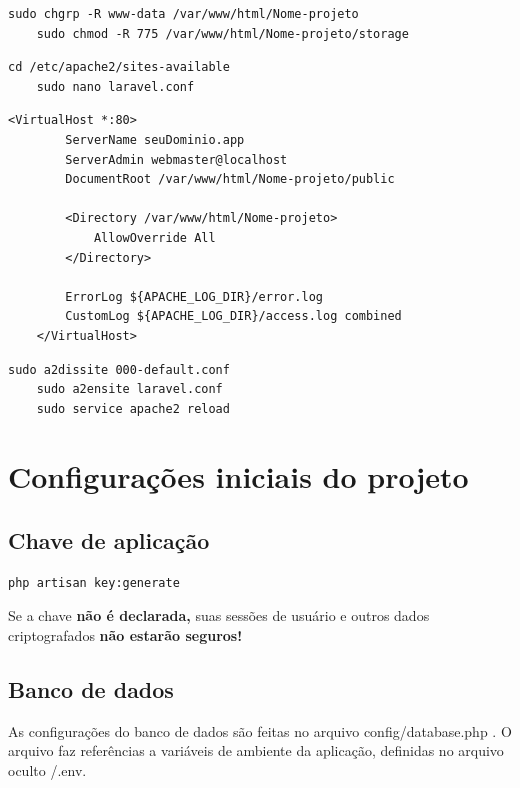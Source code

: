 \documentclass[
12pt,				%
openany,			%
twoside,			%
a4paper,			%
english,			%
french,				%
spanish,			%
brazil,				%
]{abntex2}
\begin{document}
\begin{lstlisting}[style=bash,caption={Permissões de acesso no apache}]
    sudo chgrp -R www-data /var/www/html/Nome-projeto
    sudo chmod -R 775 /var/www/html/Nome-projeto/storage
\end{lstlisting}

\begin{lstlisting}[style=bash,caption={Arquivo de configuração do projeto}]
    cd /etc/apache2/sites-available
    sudo nano laravel.conf
\end{lstlisting}

\begin{lstlisting}[style=bash,caption={\textit{laravel.conf}}]
    <VirtualHost *:80>
        ServerName seuDominio.app
        ServerAdmin webmaster@localhost
        DocumentRoot /var/www/html/Nome-projeto/public

        <Directory /var/www/html/Nome-projeto>
            AllowOverride All
        </Directory>

        ErrorLog ${APACHE_LOG_DIR}/error.log
        CustomLog ${APACHE_LOG_DIR}/access.log combined
    </VirtualHost>
\end{lstlisting}

\begin{lstlisting}[style=bash,caption={Desabilitando virtualhost padrão e habilitando o novo}]
    sudo a2dissite 000-default.conf
    sudo a2ensite laravel.conf
    sudo service apache2 reload
\end{lstlisting}

\section{Configurações iniciais do projeto}

\subsection{Chave de aplicação}

\begin{lstlisting}[style=bash,caption={Gerando chave de aplicação}]
    php artisan key:generate
\end{lstlisting}

\begin{leftbar}
    Se a chave \textbf{não é declarada,} suas sessões de usuário e outros dados criptografados \textbf{não estarão seguros!}
\end{leftbar}

\subsection{Banco de dados}
As configurações do banco de dados são feitas no arquivo config/database.php . O
arquivo faz referências a variáveis de ambiente da aplicação, definidas no arquivo oculto /.env.
\end{document}
